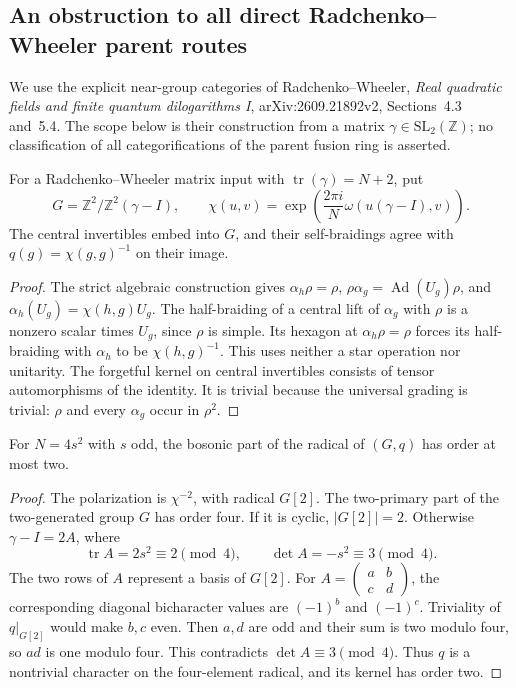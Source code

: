 \subsection{An obstruction to all direct Radchenko--Wheeler parent routes}
\label{subsec:focus-r3472-rw}

We use the explicit near-group categories of Radchenko--Wheeler,
\emph{Real quadratic fields and finite quantum dilogarithms I},
arXiv:2609.21892v2, Sections~4.3 and~5.4. The scope below is their
construction from a matrix $\gamma\in\mathrm{SL}_2(\mathbb Z)$;
no classification of all categorifications of the parent fusion ring
is asserted.

\begin{lemma}\label{lem:focus-rw-halfbraiding}
For a Radchenko--Wheeler matrix input with
$\operatorname{tr}(\gamma)=N+2$, put
\[
 G=\mathbb Z^2/\mathbb Z^2(\gamma-I),\qquad
 \chi(u,v)=\exp\!\left(\frac{2\pi i}{N}
                  \omega(u(\gamma-I),v)\right).
\]
The central invertibles embed into $G$, and their self-braidings agree
with $q(g)=\chi(g,g)^{-1}$ on their image.
\end{lemma}
\begin{proof}
The strict algebraic construction gives
$\alpha_h\rho=\rho$,
$\rho\alpha_g=\operatorname{Ad}(U_g)\rho$, and
$\alpha_h(U_g)=\chi(h,g)U_g$.
The half-braiding of a central lift of $\alpha_g$ with $\rho$ is a
nonzero scalar times $U_g$, since $\rho$ is simple. Its hexagon at
$\alpha_h\rho=\rho$ forces its half-braiding with $\alpha_h$ to be
$\chi(h,g)^{-1}$. This uses neither a star operation nor unitarity.
The forgetful kernel on central invertibles consists of tensor
automorphisms of the identity. It is trivial because the universal
grading is trivial: $\rho$ and every $\alpha_g$ occur in $\rho^2$.
\end{proof}

\begin{lemma}\label{lem:focus-rw-odd-square}
For $N=4s^2$ with $s$ odd, the bosonic part of the radical of
$(G,q)$ has order at most two.
\end{lemma}
\begin{proof}
The polarization is $\chi^{-2}$, with radical $G[2]$.
The two-primary part of the two-generated group $G$ has order four.
If it is cyclic, $|G[2]|=2$. Otherwise
$\gamma-I=2A$, where
\[
 \operatorname{tr}A=2s^2\equiv2\pmod4,\qquad
 \det A=-s^2\equiv3\pmod4.
\]
The two rows of $A$ represent a basis of $G[2]$. For
$A=\left(\begin{smallmatrix}a&b\\c&d\end{smallmatrix}\right)$,
the corresponding diagonal bicharacter values are $(-1)^b$ and
$(-1)^c$. Triviality of $q|_{G[2]}$ would make $b,c$ even.
Then $a,d$ are odd and their sum is two modulo four, so $ad$ is one
modulo four. This contradicts $\det A\equiv3\pmod4$.
Thus $q$ is a nontrivial character on the four-element radical,
and its kernel has order two.
\end{proof}

